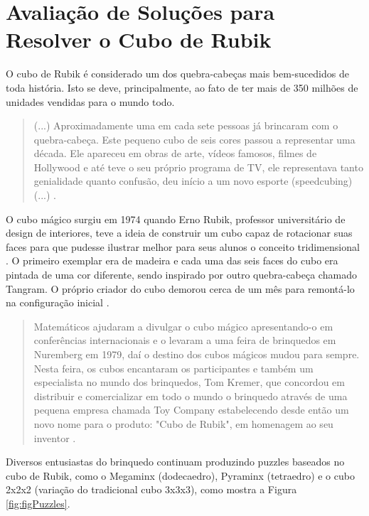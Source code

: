 \chapter{Avaliação de Soluções para Resolver o Cubo de Rubik}

O cubo de Rubik é considerado um dos quebra-cabeças mais bem-sucedidos de toda história. Isto se deve, principalmente, ao fato de ter mais de 350 milhões de unidades vendidas para o mundo todo. 


\begin{quotation}
(...) Aproximadamente uma em cada sete pessoas já brincaram com o quebra-cabeça. Este pequeno cubo de seis cores passou a representar uma década. Ele apareceu em obras de arte, vídeos famosos, filmes de Hollywood e até teve o seu próprio programa de TV, ele representava tanto genialidade quanto confusão, deu início a um novo esporte (speedcubing) (...) \cite{alecio}.
\end{quotation}


O cubo mágico surgiu em 1974 quando Erno Rubik, professor universitário de design de interiores, teve a ideia de construir um cubo capaz de rotacionar suas faces para que pudesse ilustrar melhor para seus alunos o conceito tridimensional \cite{luis}. O primeiro exemplar era de madeira e cada uma das seis faces do cubo era pintada de uma cor diferente, sendo inspirado por outro quebra-cabeça chamado Tangram. O próprio criador do cubo demorou cerca de um mês para remontá-lo na configuração inicial \cite{luis}.


\begin{quotation}
Matemáticos ajudaram a divulgar o cubo mágico apresentando-o em conferências internacionais e o levaram a uma feira de brinquedos em Nuremberg em 1979, daí o destino dos cubos mágicos mudou para sempre. Nesta feira, os cubos encantaram os participantes e também um especialista no mundo dos brinquedos, Tom Kremer, que concordou em distribuir e comercializar em todo o mundo o brinquedo através de uma pequena empresa chamada Toy Company estabelecendo desde então um novo nome para o produto: "Cubo de Rubik", em homenagem ao seu inventor \cite{jose}.
\end{quotation}


Diversos entusiastas do brinquedo continuam produzindo puzzles baseados no cubo de Rubik, como o Megaminx (dodecaedro), Pyraminx (tetraedro) e o cubo 2x2x2 (variação do tradicional cubo 3x3x3), como mostra a Figura \ref{fig:figPuzzles}.

